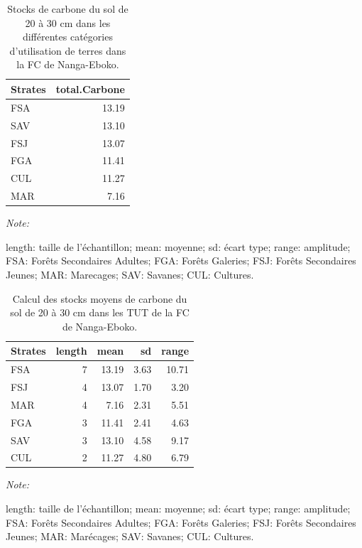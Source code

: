 \documentclass[
  12pt,
  a4paper,
  extrafontsizes,
  onecolumn,
  openright]{book}
\theoremstyle{definition}
\theoremstyle{definition}
\theoremstyle{definition}
\theoremstyle{definition}
\theoremstyle{remark}
\begin{document}
\begin{table}[H]
\centering
\caption{\label{tab:Stockscarbonesolde20-30cmNanga-Eboko}Stocks de carbone du sol de 20 à 30 cm dans les différentes catégories d'utilisation de terres dans la FC de Nanga-Eboko.}
\centering
\begin{threeparttable}
\begin{tabular}[t]{lr}
\toprule
Strates & total.Carbone\\
\midrule
FSA & 13.19\\
SAV & 13.10\\
FSJ & 13.07\\
FGA & 11.41\\
CUL & 11.27\\
\addlinespace
MAR & 7.16\\
\bottomrule
\end{tabular}
\begin{tablenotes}
\item \textit{Note: } 
\item length: taille de l'échantillon; mean: moyenne; sd: écart type; range: amplitude; FSA: Forêts Secondaires Adultes; FGA: Forêts Galeries; FSJ: Forêts Secondaires Jeunes; MAR: Marecages; SAV: Savanes; CUL: Cultures.
\end{tablenotes}
\end{threeparttable}
\end{table}

\begin{table}[H]
\centering
\caption{\label{tab:Stocksmoyenssol20-30cmFCNanga-Eboko}Calcul des stocks moyens de carbone du sol de 20 à 30 cm dans les TUT de la FC de Nanga-Eboko.}
\centering
\begin{threeparttable}
\begin{tabular}[t]{lrrrr}
\toprule
Strates & length & mean & sd & range\\
\midrule
FSA & 7 & 13.19 & 3.63 & 10.71\\
FSJ & 4 & 13.07 & 1.70 & 3.20\\
MAR & 4 & 7.16 & 2.31 & 5.51\\
FGA & 3 & 11.41 & 2.41 & 4.63\\
SAV & 3 & 13.10 & 4.58 & 9.17\\
\addlinespace
CUL & 2 & 11.27 & 4.80 & 6.79\\
\bottomrule
\end{tabular}
\begin{tablenotes}
\item \textit{Note: } 
\item length: taille de l'échantillon; mean: moyenne; sd: écart type; range: amplitude; FSA: Forêts Secondaires Adultes; FGA: Forêts Galeries; FSJ: Forêts Secondaires Jeunes; MAR: Marécages; SAV: Savanes; CUL: Cultures.
\end{tablenotes}
\end{threeparttable}
\end{table}
\end{document}
